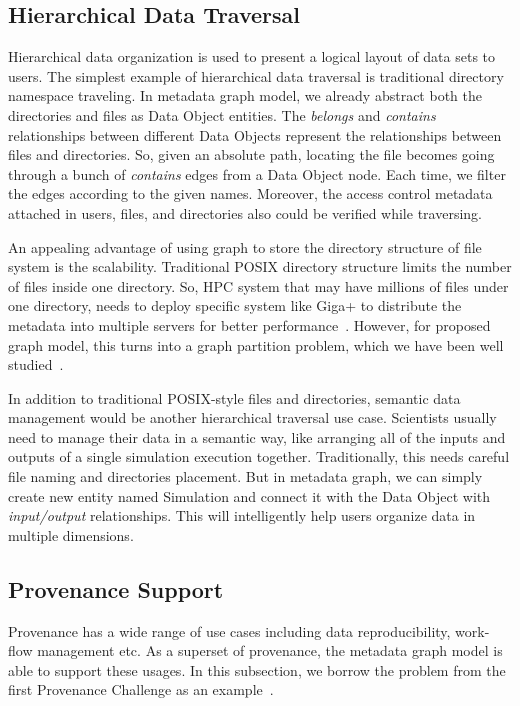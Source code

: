 \subsection{Hierarchical Data Traversal}
Hierarchical data organization is used to present a logical layout of data sets to users. The simplest example of hierarchical data traversal is traditional directory namespace traveling. In metadata graph model, we already abstract both the directories and files as Data Object entities. The \textit{belongs} and \textit{contains} relationships between different Data Objects represent the relationships between files and directories. So, given an absolute path, locating the file becomes going through a bunch of \textit{contains} edges from a Data Object node. Each time, we filter the edges according to the given names. Moreover, the access control metadata attached in users, files, and directories also could be verified while traversing. 


An appealing advantage of using graph to store the directory structure of file system is the scalability. Traditional POSIX directory structure limits the number of files inside one directory. So, HPC system that may have millions of files under one directory, needs to deploy specific system like Giga+ to distribute the metadata into multiple servers for better performance~\cite{patil2011scale}. However, for proposed graph model, this turns into a graph partition problem, which we have been well studied~\cite{kim2012sbv, gonzalez2012powergraph, abou2006multilevel}.

In addition to traditional POSIX-style files and directories, semantic data management would be another hierarchical traversal use case. Scientists usually need to manage their data in a semantic way, like arranging all of the inputs and outputs of a single simulation execution together. Traditionally, this needs careful file naming and directories placement. But in metadata graph, we can simply create new entity named Simulation and connect it with the Data Object with \textit{input/output} relationships. This will intelligently help users organize data in multiple dimensions.

\subsection{Provenance Support}
Provenance has a wide range of use cases including data reproducibility, work-flow management etc. As a superset of provenance, the metadata graph model is able to support these usages. In this subsection, we borrow the problem from the first Provenance Challenge as an example~\cite{provchallengeweb}. 

